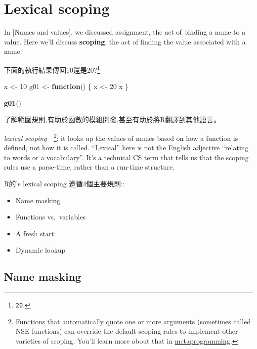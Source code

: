 \documentclass[]{book}
\newenvironment{Shaded}{\begin{snugshade}}{\end{snugshade}}
\newcommand{\ControlFlowTok}[1]{\textcolor[rgb]{0.13,0.29,0.53}{\textbf{#1}}}
\newcommand{\DecValTok}[1]{\textcolor[rgb]{0.00,0.00,0.81}{#1}}
\newcommand{\KeywordTok}[1]{\textcolor[rgb]{0.13,0.29,0.53}{\textbf{#1}}}
\newcommand{\NormalTok}[1]{#1}
\newcommand{\StringTok}[1]{\textcolor[rgb]{0.31,0.60,0.02}{#1}}
\providecommand{\tightlist}{%
  \setlength{\itemsep}{0pt}\setlength{\parskip}{0pt}}
\let\rmarkdownfootnote\footnote%
\def\footnote{\protect\rmarkdownfootnote}
\theoremstyle{definition}
\theoremstyle{definition}
\theoremstyle{definition}
\theoremstyle{remark}
\begin{document}
\hypertarget{lexical-scoping}{%
\section{Lexical scoping}\label{lexical-scoping}}

In {[}Names and values{]}, we discussed assignment, the act of binding a
name to a value. Here we'll discuss \textbf{scoping}, the act of finding
the value associated with a name.

下面的執行結果傳回10還是20?\footnote{\texttt{20}.}

\begin{Shaded}
\begin{Highlighting}[]
\NormalTok{x <-}\StringTok{ }\DecValTok{10}
\NormalTok{g01 <-}\StringTok{ }\ControlFlowTok{function}\NormalTok{() \{}
\NormalTok{  x <-}\StringTok{ }\DecValTok{20}
\NormalTok{  x}
\NormalTok{\}}

\KeywordTok{g01}\NormalTok{()}
\end{Highlighting}
\end{Shaded}

了解範圍規則,有助於函數的模組開發,甚至有助於將R翻譯到其他語言。

\emph{lexical scoping}　\footnote{Functions that automatically quote one
  or more arguments (sometimes called NSE functions) can override the
  default scoping rules to implement other varieties of scoping. You'll
  learn more about that in \protect\hyperlink{meta}{metaprogramming}.}:
it looks up the values of names based on how a function is defined, not
how it is called. ``Lexical'' here is not the English adjective
``relating to words or a vocabulary''. It's a technical CS term that
tells us that the scoping rules use a parse-time, rather than a run-time
structure.

R的's lexical scoping 遵循4個主要規則::

\begin{itemize}
\tightlist
\item
  Name masking
\item
  Functions vs.~variables
\item
  A fresh start
\item
  Dynamic lookup
\end{itemize}

\hypertarget{name-masking}{%
\subsection{Name masking}\label{name-masking}}
\end{document}
